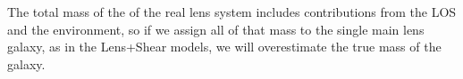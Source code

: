 The total mass of the of the real lens system includes contributions from the LOS and the environment, so if we assign all of that mass to the single main lens galaxy, as in the Lens+Shear models, we will overestimate the true mass of the galaxy.